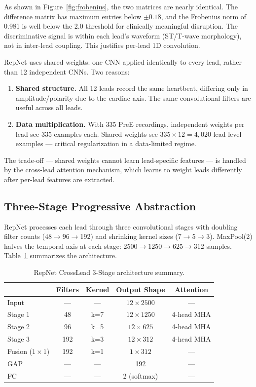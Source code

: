 \documentclass[sigconf,nonacm]{acmart}
\begin{document}
As shown in Figure~\ref{fig:frobenius}, the two matrices are nearly identical. The difference matrix has maximum entries below $\pm 0.18$, and the Frobenius norm of 0.981 is well below the 2.0 threshold for clinically meaningful disruption. The discriminative signal is within each lead's waveform (ST/T-wave morphology), not in inter-lead coupling. This justifies per-lead 1D convolution.

RepNet uses shared weights: one CNN applied identically to every lead, rather than 12 independent CNNs. Two reasons:
\begin{enumerate}
\item \textbf{Shared structure.} All 12 leads record the same heartbeat, differing only in amplitude/polarity due to the cardiac axis. The same convolutional filters are useful across all leads.
\item \textbf{Data multiplication.} With 335 PreE recordings, independent weights per lead see 335 examples each. Shared weights see $335 \times 12 = 4{,}020$ lead-level examples --- critical regularization in a data-limited regime.
\end{enumerate}

The trade-off --- shared weights cannot learn lead-specific features --- is handled by the cross-lead attention mechanism, which learns to weight leads differently after per-lead features are extracted.

\subsection{Three-Stage Progressive Abstraction}

RepNet processes each lead through three convolutional stages with doubling filter counts (48$\to$96$\to$192) and shrinking kernel sizes (7$\to$5$\to$3). MaxPool(2) halves the temporal axis at each stage: $2500 \to 1250 \to 625 \to 312$ samples. Table~\ref{tab:arch} summarizes the architecture.

\begin{table}[H]
\centering
\caption{RepNet CrossLead 3-Stage architecture summary.}
\label{tab:arch}
\small
\begin{tabular}{lcccc}
\toprule
 & \textbf{Filters} & \textbf{Kernel} & \textbf{Output Shape} & \textbf{Attention} \\
\midrule
Input          & ---  & ---  & $12 \times 2500$ & ---        \\
Stage 1        & 48   & k=7  & $12 \times 1250$ & 4-head MHA \\
Stage 2        & 96   & k=5  & $12 \times 625$  & 4-head MHA \\
Stage 3        & 192  & k=3  & $12 \times 312$  & 4-head MHA \\
Fusion ($1\!\times\!1$) & 192  & k=1  & $1 \times 312$   & ---        \\
GAP            & ---  & ---  & 192              & ---        \\
FC             & ---  & ---  & 2 (softmax)      & ---        \\
\bottomrule
\end{tabular}
\end{table}
\end{document}
